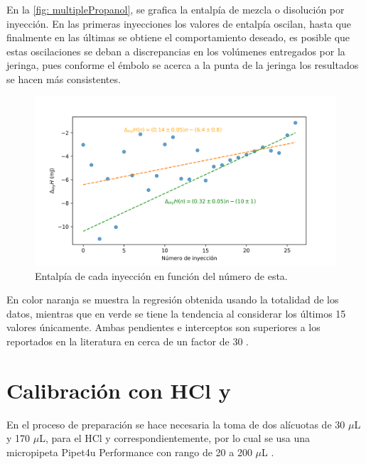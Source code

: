 		En la \autoref{fig: multiplePropanol}, se grafica la entalp\'ia de mezcla o disolución por inyecci\'on. En las primeras inyecciones los valores de entalp\'ia oscilan, hasta que finalmente en las \'ultimas se obtiene el comportamiento deseado, es posible que estas oscilaciones se deban a discrepancias en los vol\'umenes entregados por la jeringa, pues conforme el \'embolo se acerca a la punta de la jeringa los resultados se hacen más consistentes.
		\begin{figure}[h]
			\centering
			\includegraphics[width=\linewidth]{../Data/ChemicalCalibrations/multipleInt}
			\caption{Entalp\'ia de cada inyecci\'on en funci\'on del n\'umero de esta.}
			\label{fig: multiplePropanol}
		\end{figure}
	
		En color naranja se muestra la regresi\'on obtenida usando la totalidad de los datos, mientras que en verde se tiene la tendencia al considerar los \'ultimos 15 valores \'unicamente. Ambas pendientes e interceptos son superiores a los reportados en la literatura en cerca de un factor de 30 \cite{demarse2011calibration, nanoitc}.
		
\section{Calibraci\'on con HCl y }\label{sec: soluciones}
	 En el proceso de preparaci\'on se hace necesaria la toma de dos al\'icuotas de 30 $\mu$L y 170 $\mu$L, para el HCl y  correspondientemente, por lo cual se usa una micropipeta Pipet4u Performance con rango de 20 a 200 $\mu$L \cite{pipet4u}.
	
